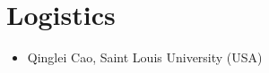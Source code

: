 \section*{Logistics}
\begin{itemize}
\item Qinglei Cao, Saint Louis University (USA)
\end{itemize}

